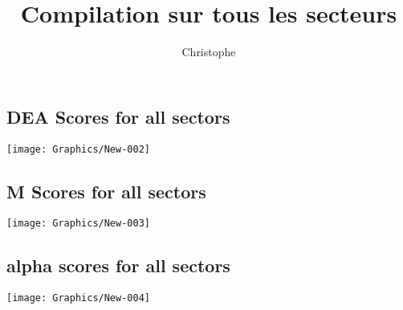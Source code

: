 \documentclass[a4paper]{article}
\title{Compilation sur tous les secteurs }
\author{Christophe }
\begin{document}



  



\maketitle
\tableofcontents
\newpage








\clearpage
\subsection{DEA Scores for all sectors}
\texttt{[image: Graphics/New-002]}
\clearpage
\subsection{M Scores for all sectors}
\texttt{[image: Graphics/New-003]}

\clearpage
\subsection{alpha scores for all sectors}
\texttt{[image: Graphics/New-004]}
\end{document}
